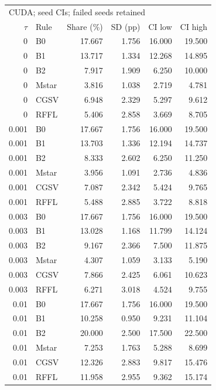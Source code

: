 \begin{tabular}{rlrrrr}
\toprule
\multicolumn{6}{l}{CUDA; seed CIs; failed seeds retained} \\
$\tau$ & Rule & Share (\%) & SD (pp) & CI low & CI high \\
\midrule
0 & B0 & 17.667 & 1.756 & 16.000 & 19.500 \\
0 & B1 & 13.717 & 1.334 & 12.268 & 14.895 \\
0 & B2 & 7.917 & 1.909 & 6.250 & 10.000 \\
0 & Mstar & 3.816 & 1.038 & 2.719 & 4.781 \\
0 & CGSV & 6.948 & 2.329 & 5.297 & 9.612 \\
0 & RFFL & 5.406 & 2.858 & 3.669 & 8.705 \\
0.001 & B0 & 17.667 & 1.756 & 16.000 & 19.500 \\
0.001 & B1 & 13.703 & 1.336 & 12.194 & 14.737 \\
0.001 & B2 & 8.333 & 2.602 & 6.250 & 11.250 \\
0.001 & Mstar & 3.956 & 1.091 & 2.736 & 4.836 \\
0.001 & CGSV & 7.087 & 2.342 & 5.424 & 9.765 \\
0.001 & RFFL & 5.488 & 2.885 & 3.722 & 8.818 \\
0.003 & B0 & 17.667 & 1.756 & 16.000 & 19.500 \\
0.003 & B1 & 13.028 & 1.168 & 11.799 & 14.124 \\
0.003 & B2 & 9.167 & 2.366 & 7.500 & 11.875 \\
0.003 & Mstar & 4.307 & 1.059 & 3.133 & 5.190 \\
0.003 & CGSV & 7.866 & 2.425 & 6.061 & 10.623 \\
0.003 & RFFL & 6.271 & 3.018 & 4.524 & 9.755 \\
0.01 & B0 & 17.667 & 1.756 & 16.000 & 19.500 \\
0.01 & B1 & 10.258 & 0.950 & 9.231 & 11.104 \\
0.01 & B2 & 20.000 & 2.500 & 17.500 & 22.500 \\
0.01 & Mstar & 7.253 & 1.763 & 5.288 & 8.699 \\
0.01 & CGSV & 12.326 & 2.883 & 9.817 & 15.476 \\
0.01 & RFFL & 11.958 & 2.955 & 9.362 & 15.174 \\
\bottomrule
\end{tabular}
